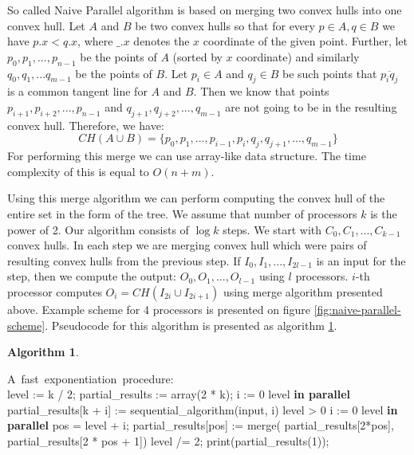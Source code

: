 \documentclass[letterpaper]{article}
\theoremstyle{definition}
\newtheorem{algorithm}{Algorithm}
\begin{document}
So called Naive Parallel algorithm is based on merging two convex hulls into one convex hull. 
Let $A$ and $B$ be two convex hulls so that for every $p \in A, q \in B$ we have $p.x < q.x$, where $\_.x$ denotes the $x$ coordinate of the given point.
Further, let $p_0, p_1, ..., p_{n-1}$ be the points of $A$ (sorted by $x$ coordinate) and similarly $q_0, q_1, ... q_{m-1}$ be the points of $B$.
Let $p_i \in A$ and $q_j \in B$ be such points that $\overline{p_iq_j}$ is a common tangent line for $A$ and $B$.
Then we know that points $p_{i+1}, p_{i + 2}, ..., p_{n - 1}$ and $q_{j + 1}, q_{j + 2}, ..., q_{m - 1}$ are not going to be in the resulting convex hull.
Therefore, we have:
$$CH(A \cup B) = \{ p_0, p_1, ..., p_{i - 1}, p_i, q_j, q_{j + 1}, ..., q_{m - 1} \}$$
For performing this merge we can use array-like data structure.
The time complexity of this is equal to $O(n + m)$.

Using this merge algorithm we can perform computing the convex hull of the entire set in the form of the tree. 
We assume that number of processors $k$ is the power of 2. 
Our algorithm consists of $\log k$ steps.
We start with $C_0, C_1, ..., C_{k-1}$ convex hulls.
In each step we are merging convex hull which were pairs of resulting convex hulls from the previous step. 
If $I_0, I_1, ..., I_{2l - 1}$ is an input for the step, then we compute the output: $O_0, O_1, ..., O_{l - 1}$ using $l$ processors. 
$i$-th processor computes $O_i = CH(I_{2i} \cup I_{2i+1})$ using merge algorithm presented above.
Example scheme for 4 processors is presented on figure \ref{fig:naive-parallel-scheme}.
Pseudocode for this algorithm is presented as algorithm \ref{alg:naive-parallel}.

\begin{algorithm}
\label{alg:naive-parallel}
\begin{program}
\mbox{A fast exponentiation procedure:}
\BEGIN \\ %
  level := k / 2;
  partial\_results := array(2 * k);
  \FOR i := 0 \TO level  \textrm{\bf{\;in parallel}} \DO
    partial\_results[k + i] := 
    \;\;\;\; sequential\_algorithm(input, i)
  \OD
  \WHILE level > 0 \DO
    \FOR i := 0 \TO level  \textrm{\bf{\;in parallel}} \DO
      pos = level + i;
      partial\_results[pos] := merge(
      \;\;\;\; partial\_results[2*pos],
      \;\;\;\; partial\_results[2 * pos + 1])
    \OD
    level /= 2;
  \OD
  print(partial\_results(1));

\END
\end{program}
\end{algorithm}
\end{document}
